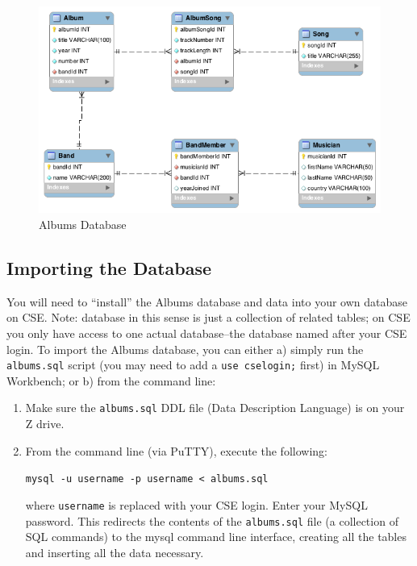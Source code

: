 \documentclass[12pt]{scrartcl}
\begin{document}
\begin{figure}[h]
\centering
\includegraphics[scale=.650]{sql/albums}
\caption{Albums Database}
\label{figure:albumDB}
\end{figure}

\subsection*{Importing the Database}

You will need to ``install'' the Albums database and data into your 
own database on CSE.  Note: database in this sense is just a collection 
of related tables; on CSE you only have access to one actual 
database--the database named after your CSE login.  To import the 
Albums database, you can either a) simply run the \texttt{albums.sql}
script (you may need to add a \texttt{use cselogin;} first)
in MySQL Workbench; or b) from the command line:

\begin{enumerate}
  \item Make sure the \texttt{albums.sql} DDL file (Data 
  	Description Language) is on your Z drive.  
  \item From the command line (via PuTTY), execute the following:
  
  \texttt{mysql -u username -p username < albums.sql}
  
  where \texttt{username} is replaced with your CSE login.
  Enter your MySQL password.  This redirects the contents of the 
  \texttt{albums.sql} file (a collection of SQL commands) 
  to the mysql command line interface, creating all the tables and 
  inserting all the data necessary.
\end{enumerate}
  
\end{document}

